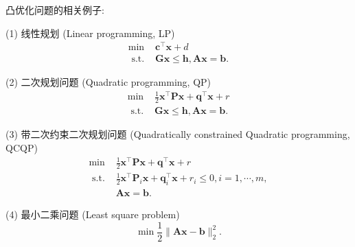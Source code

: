 \begin{example}凸优化问题的相关例子:
\par    (1) 线性规划 (Linear programming, LP)\cite{1963Linear}
    \begin{equation}
    \begin{array}{ll}
    \min & \bm{c}^{\top} \bm{x}+d \\
    \text { s.t. } & \bm{G} \bm{x} \leq \bm{h}, \bm{A} \bm{x}=\bm{b} .
    \end{array}
        \nonumber
    \end{equation}
\par    (2) 二次规划问题 (Quadratic programming, QP)\cite{1995Sequential}
    \begin{equation}
    \begin{array}{ll}
    \min & \frac{1}{2} \bm{x}^{\top} \bm{P} \bm{x}+\bm{q}^{\top} \bm{x}+r \\
    \text { s.t. } & \bm{G} \bm{x} \leq \bm{h}, \bm{A} \bm{x}=\bm{b} .
    \end{array}
        \nonumber
    \end{equation}
\par    (3) 带二次约束二次规划问题 (Quadratically constrained Quadratic programming, QCQP)\cite{1982Quadratically}
    \begin{equation}
    \begin{array}{ll}
    \min & \frac{1}{2} \bm{x}^{\top} \bm{P} \bm{x}+\bm{q}^{\top} \bm{x}+r \\
    \text { s.t. } & \frac{1}{2} \bm{x}^{\top} \bm{P}_{i} \bm{x}+\bm{q}_{i}^{\top} \bm{x}+r_{i} \leq 0, i=1, \cdots, m ,\\
    & \bm{A} \bm{x}=\bm{b} .
    \end{array}
        \nonumber
    \end{equation}
\par (4) 最小二乘问题 (Least square problem)\cite{1989Least}
    \begin{equation}
    \min \frac{1}{2}\|\bm{A} \bm{x}-\bm{b}\|_{2}^{2} .
        \nonumber
    \end{equation}
\end{example}

